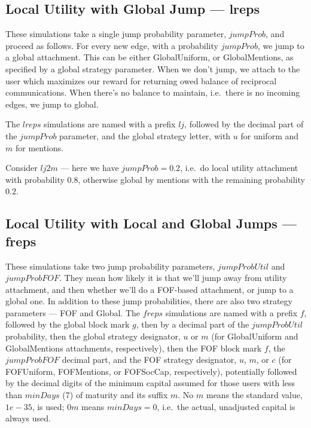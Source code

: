 \documentclass[10pt,oneside]{memoir}
\begin{document}
\subsection{Local Utility with Global Jump --- lreps}
\label{localutilitywithglobaljumplreps}

These simulations take a single jump probability parameter, $jumpProb$, and proceed as follows.  For every new edge, with a probability $jumpProb$, we jump to a global attachment.  This can be either GlobalUniform, or GlobalMentions, as specified by a global strategy parameter.  When we don't jump, we attach to the user which maximizes our reward for returning owed balance of reciprocal communications.  When there's no balance to maintain, i.e.\ there is no incoming edges, we jump to global.


The $lreps$ simulations are named with a prefix $lj$, followed by the decimal part of the $jumpProb$ parameter, and the global strategy letter, with $u$ for uniform and $m$ for mentions.


Consider $lj2m$ --- here we have $jumpProb = 0.2$, i.e.\ do local utility attachment with probability $0.8$, otherwise global by mentions with the remaining probability $0.2$.


\subsection{Local Utility with Local and Global Jumps --- freps}
\label{localutilitywithlocalandglobaljumpsfreps}

These simulations take two jump probability parameters, $jumpProbUtil$ and $jumpProbFOF$.  They mean how likely it is that we'll jump away from utility attachment, and then whether we'll do a FOF-based attachment, or jump to a global one.  In addition to these jump probabilities, there are also two strategy parameters --- FOF and Global.
The $freps$ simulations are named with a prefix $f$, followed by the global block mark $g$, then by a decimal part of the $jumpProbUtil$ probability, then the global strategy designator, $u$ or $m$ (for GlobalUniform and GlobalMentions attachments, respectively), then the FOF block mark $f$, the $jumpProbFOF$ decimal part, and the FOF strategy designator, $u$, $m$, or $c$ (for FOFUniform, FOFMentions, or FOFSocCap, respectively), potentially followed by the decimal digits of the minimum capital assumed for those users with less than $minDays$ (7) of maturity and its suffix $m$.  No $m$ means the standard value, $1e-35$, is used; $0m$ means $minDays = 0$, i.e.\ the actual, unadjusted capital is always used.
\end{document}
